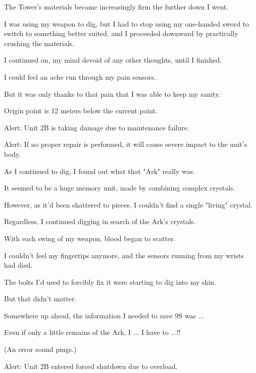 \begin{play}
  The Tower's materials became increasingly firm the further down I went.

  I was using my weapon to dig, but I had to stop using my one-handed sword to switch to something better suited, and I proceeded downward by practically crushing the materials.

  I continued on, my mind devoid of any other thoughts, until I finished.

  I could feel an ache run through my pain sensors.

  But it was only thanks to that pain that I was able to keep my sanity.

  Origin point is 12 meters below the current point.

  Alert: Unit 2B is taking damage due to maintenance failure.

  Alert: If no proper repair is performed, it will cause severe impact to the unit's body.

  As I continued to dig, I found out what that "Ark" really was.

  It seemed to be a huge memory unit, made by combining complex crystals.

  However, as it'd been shattered to pieces, I couldn't find a single "living" crystal.

  Regardless, I continued digging in search of the Ark's crystals.

  With each swing of my weapon, blood began to scatter.

  I couldn't feel my fingertips anymore, and the sensors running from my wrists had died.

  The bolts I'd used to forcibly fix it were starting to dig into my skin.

  But that didn't matter.

  Somewhere up ahead, the information I needed to save 9S was ...

  Even if only a little remains of the Ark, I ... I have to ...!!

(An error sound pings.)

  Alert: Unit 2B entered forced shutdown due to overload.
\end{play}
